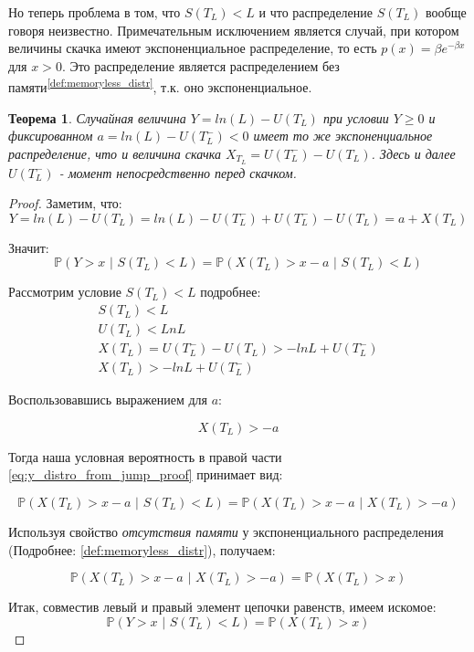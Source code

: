 \documentclass[a4paper,12pt]{article}
\newtheorem{theorem}{Теорема}
\theoremstyle{definition}
\begin{document}
Но теперь проблема в том, что $S(T_L) < L$ и что
распределение $S(T_L)$ вообще говоря неизвестно. Примечательным исключением является случай, при котором величины скачка имеют экспоненциальное распределение, то есть $p(x) = \beta e^{-\beta x}$ для $x > 0$. Это распределение является распределением без памяти\textsuperscript{{\ref{def:memoryless_distr}}}, т.к. оно экспоненциальное.

\begin{theorem}
Случайная величина $Y=ln(L) - U(T_L)$ при условии $Y \ge 0$ и фиксированном $a = ln(L) - U(T_L^{-}) < 0$ имеет то же экспоненциальное распределение, что и величина скачка $X_{T_L}=U(T_L^{-})-U(T_L)$. Здесь и далее $U(T_L^{-})$ - момент непосредственно перед скачком.
\end{theorem}
\begin{proof}
Заметим, что:
\begin{equation*}
    Y = ln(L) - U(T_L) = ln(L) - U(T_L^{-}) + U(T_L^{-}) - U(T_L) = a + X(T_L)
\end{equation*}

Значит:
\begin{equation}\label{eq:y_distro_from_jump_proof}
    \mathbb{P}(Y > x \text{ | } S(T_L) < L) = \mathbb{P}(X(T_L) > x - a \text{ | } S(T_L) < L)
\end{equation}

Рассмотрим условие $S(T_L) < L$ подробнее:
\begin{gather*}
    S(T_L) < L \\
    U(T_L) < Ln L \\
    X(T_L) = U(T_L^{-}) - U(T_L) > -ln L + U(T_L^{-}) \\
    X(T_L) > - ln L + U(T_L^{-})
\end{gather*}

Воспользовавшись выражением для $a$:

\begin{equation*}
    X(T_L) > -a
\end{equation*}

Тогда наша условная вероятность в правой части \eqref{eq:y_distro_from_jump_proof} принимает вид:

\begin{equation*}
    \mathbb{P}(X(T_L) > x - a \text{ | } S(T_L) < L) = \mathbb{P}(X(T_L) > x - a \text{ | } X(T_L) > -a)
\end{equation*}

Используя свойство \textit{отсутствия памяти} у экспоненциального распределения (Подробнее: \ref{def:memoryless_distr}), получаем:

\begin{equation*}
    \mathbb{P}(X(T_L) > x - a \text{ | } X(T_L) > -a) = \mathbb{P}(X(T_L) > x)
\end{equation*}

Итак, совместив левый и правый элемент цепочки равенств, имеем искомое:
\begin{equation}\label{eq:y_distro_from_jump}
    \mathbb{P}(Y > x \text{ | } S(T_L) < L) = \mathbb{P}(X(T_L) > x)
\end{equation}

\end{proof}
\end{document}
